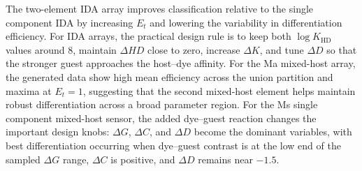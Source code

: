 \documentclass[11pt]{article}
\newcommand{\KHD}{K_{\mathrm{HD}}}
\newcommand{\Et}{E_t}
\begin{document}
The two-element IDA array improves classification relative to the single
component IDA by increasing $\Et$ and lowering the variability in differentiation
efficiency. For IDA arrays, the practical design rule is to keep both
$\log\KHD$ values around 8, maintain $\Delta HD$ close to zero, increase
$\Delta K$, and tune $\Delta D$ so that the stronger guest approaches the
host--dye affinity. For the Ma mixed-host array, the generated data show high
mean efficiency across the union partition and maxima at $\Et=1$, suggesting
that the second mixed-host element helps maintain robust differentiation across
a broad parameter region. For the Ms single component mixed-host sensor, the
added dye--guest reaction changes the important design knobs: $\Delta G$,
$\Delta C$, and $\Delta D$ become the dominant variables, with best
differentiation occurring when dye--guest contrast is at the low end of the
sampled $\Delta G$ range, $\Delta C$ is positive, and $\Delta D$ remains near
$-1.5$.
\end{document}
